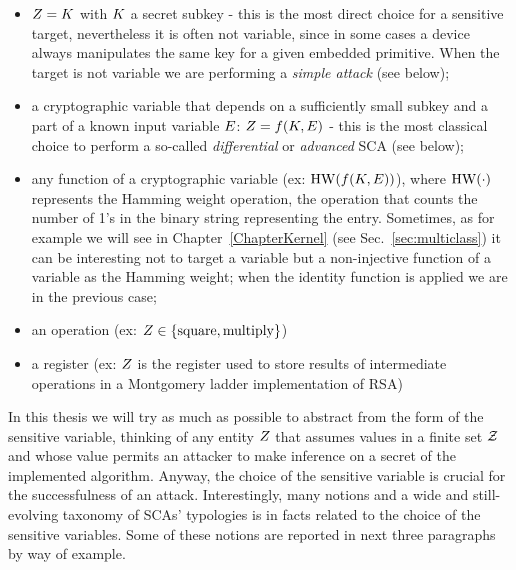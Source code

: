 \begin{itemize}
\item $Z = K$ with $K$ a secret subkey - this is the most direct choice for a sensitive target, nevertheless it is often not variable, since in some cases a device always manipulates the same key for a given embedded primitive. When the target is not variable we are performing a \emph{simple attack} (see below);
\item a cryptographic variable that depends on a sufficiently small subkey and a part of a known input variable $E$: $Z = f(K,E)$ - this is the most classical choice to perform a so-called \emph{differential} or \emph{advanced} SCA (see below);
\item any function of a cryptographic variable (ex: $\mathrm{HW}(f(K,E))$), where $\mathrm{HW}(\cdot)$ represents the Hamming weight operation, \ie the operation that counts the number of 1's in the binary string representing the entry. Sometimes, as for example we will see in Chapter~\ref{ChapterKernel} (see Sec.~\ref{sec:multiclass}) it can be interesting not to target a variable but a non-injective function of a variable as the Hamming weight; when the identity function is applied we are in the previous case;
\item an operation (ex: $Z \in \{\mathrm{square}, \mathrm{multiply}\}$)
\item a register (ex: $Z$ is the register used to store results of intermediate operations in a Montgomery ladder implementation of RSA)
\end{itemize}
In this thesis we will try as much as possible to abstract from the form of the sensitive variable, thinking of any entity $Z$ that assumes values in a finite set $\mathcal{Z}$ and whose value permits an attacker to make inference on a secret of the implemented algorithm. Anyway, the choice of the sensitive variable is crucial for the successfulness of an attack. Interestingly, many notions and a wide and still-evolving taxonomy of  SCAs' typologies is in facts related to the choice of the sensitive variables. Some of these notions are reported in next three paragraphs by way of example.


